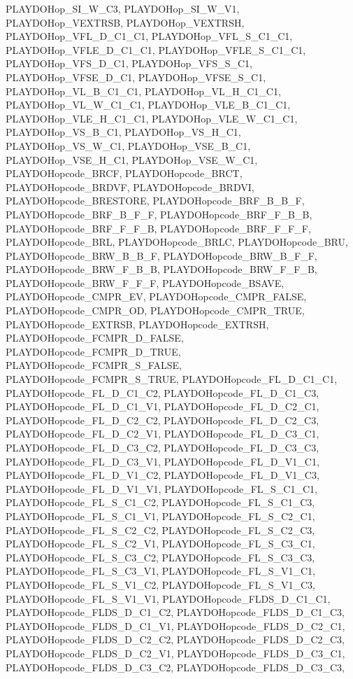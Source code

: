 PLAYDOHop\_\-SI\_\-W\_\-C3, PLAYDOHop\_\-SI\_\-W\_\-V1, PLAYDOHop\_\-VEXTRSB, PLAYDOHop\_\-VEXTRSH, PLAYDOHop\_\-VFL\_\-D\_\-C1\_\-C1, PLAYDOHop\_\-VFL\_\-S\_\-C1\_\-C1, PLAYDOHop\_\-VFLE\_\-D\_\-C1\_\-C1, PLAYDOHop\_\-VFLE\_\-S\_\-C1\_\-C1, PLAYDOHop\_\-VFS\_\-D\_\-C1, PLAYDOHop\_\-VFS\_\-S\_\-C1, PLAYDOHop\_\-VFSE\_\-D\_\-C1, PLAYDOHop\_\-VFSE\_\-S\_\-C1, PLAYDOHop\_\-VL\_\-B\_\-C1\_\-C1, PLAYDOHop\_\-VL\_\-H\_\-C1\_\-C1, PLAYDOHop\_\-VL\_\-W\_\-C1\_\-C1, PLAYDOHop\_\-VLE\_\-B\_\-C1\_\-C1, PLAYDOHop\_\-VLE\_\-H\_\-C1\_\-C1, PLAYDOHop\_\-VLE\_\-W\_\-C1\_\-C1, PLAYDOHop\_\-VS\_\-B\_\-C1, PLAYDOHop\_\-VS\_\-H\_\-C1, PLAYDOHop\_\-VS\_\-W\_\-C1, PLAYDOHop\_\-VSE\_\-B\_\-C1, PLAYDOHop\_\-VSE\_\-H\_\-C1, PLAYDOHop\_\-VSE\_\-W\_\-C1, PLAYDOHopcode\_\-BRCF, PLAYDOHopcode\_\-BRCT, PLAYDOHopcode\_\-BRDVF, PLAYDOHopcode\_\-BRDVI, PLAYDOHopcode\_\-BRESTORE, PLAYDOHopcode\_\-BRF\_\-B\_\-B\_\-F, PLAYDOHopcode\_\-BRF\_\-B\_\-F\_\-F, PLAYDOHopcode\_\-BRF\_\-F\_\-B\_\-B, PLAYDOHopcode\_\-BRF\_\-F\_\-F\_\-B, PLAYDOHopcode\_\-BRF\_\-F\_\-F\_\-F, PLAYDOHopcode\_\-BRL, PLAYDOHopcode\_\-BRLC, PLAYDOHopcode\_\-BRU, PLAYDOHopcode\_\-BRW\_\-B\_\-B\_\-F, PLAYDOHopcode\_\-BRW\_\-B\_\-F\_\-F, PLAYDOHopcode\_\-BRW\_\-F\_\-B\_\-B, PLAYDOHopcode\_\-BRW\_\-F\_\-F\_\-B, PLAYDOHopcode\_\-BRW\_\-F\_\-F\_\-F, PLAYDOHopcode\_\-BSAVE, PLAYDOHopcode\_\-CMPR\_\-EV, PLAYDOHopcode\_\-CMPR\_\-FALSE, PLAYDOHopcode\_\-CMPR\_\-OD, PLAYDOHopcode\_\-CMPR\_\-TRUE, PLAYDOHopcode\_\-EXTRSB, PLAYDOHopcode\_\-EXTRSH, PLAYDOHopcode\_\-FCMPR\_\-D\_\-FALSE, PLAYDOHopcode\_\-FCMPR\_\-D\_\-TRUE, PLAYDOHopcode\_\-FCMPR\_\-S\_\-FALSE, PLAYDOHopcode\_\-FCMPR\_\-S\_\-TRUE, PLAYDOHopcode\_\-FL\_\-D\_\-C1\_\-C1, PLAYDOHopcode\_\-FL\_\-D\_\-C1\_\-C2, PLAYDOHopcode\_\-FL\_\-D\_\-C1\_\-C3, PLAYDOHopcode\_\-FL\_\-D\_\-C1\_\-V1, PLAYDOHopcode\_\-FL\_\-D\_\-C2\_\-C1, PLAYDOHopcode\_\-FL\_\-D\_\-C2\_\-C2, PLAYDOHopcode\_\-FL\_\-D\_\-C2\_\-C3, PLAYDOHopcode\_\-FL\_\-D\_\-C2\_\-V1, PLAYDOHopcode\_\-FL\_\-D\_\-C3\_\-C1, PLAYDOHopcode\_\-FL\_\-D\_\-C3\_\-C2, PLAYDOHopcode\_\-FL\_\-D\_\-C3\_\-C3, PLAYDOHopcode\_\-FL\_\-D\_\-C3\_\-V1, PLAYDOHopcode\_\-FL\_\-D\_\-V1\_\-C1, PLAYDOHopcode\_\-FL\_\-D\_\-V1\_\-C2, PLAYDOHopcode\_\-FL\_\-D\_\-V1\_\-C3, PLAYDOHopcode\_\-FL\_\-D\_\-V1\_\-V1, PLAYDOHopcode\_\-FL\_\-S\_\-C1\_\-C1, PLAYDOHopcode\_\-FL\_\-S\_\-C1\_\-C2, PLAYDOHopcode\_\-FL\_\-S\_\-C1\_\-C3, PLAYDOHopcode\_\-FL\_\-S\_\-C1\_\-V1, PLAYDOHopcode\_\-FL\_\-S\_\-C2\_\-C1, PLAYDOHopcode\_\-FL\_\-S\_\-C2\_\-C2, PLAYDOHopcode\_\-FL\_\-S\_\-C2\_\-C3, PLAYDOHopcode\_\-FL\_\-S\_\-C2\_\-V1, PLAYDOHopcode\_\-FL\_\-S\_\-C3\_\-C1, PLAYDOHopcode\_\-FL\_\-S\_\-C3\_\-C2, PLAYDOHopcode\_\-FL\_\-S\_\-C3\_\-C3, PLAYDOHopcode\_\-FL\_\-S\_\-C3\_\-V1, PLAYDOHopcode\_\-FL\_\-S\_\-V1\_\-C1, PLAYDOHopcode\_\-FL\_\-S\_\-V1\_\-C2, PLAYDOHopcode\_\-FL\_\-S\_\-V1\_\-C3, PLAYDOHopcode\_\-FL\_\-S\_\-V1\_\-V1, PLAYDOHopcode\_\-FLDS\_\-D\_\-C1\_\-C1, PLAYDOHopcode\_\-FLDS\_\-D\_\-C1\_\-C2, PLAYDOHopcode\_\-FLDS\_\-D\_\-C1\_\-C3, PLAYDOHopcode\_\-FLDS\_\-D\_\-C1\_\-V1, PLAYDOHopcode\_\-FLDS\_\-D\_\-C2\_\-C1, PLAYDOHopcode\_\-FLDS\_\-D\_\-C2\_\-C2, PLAYDOHopcode\_\-FLDS\_\-D\_\-C2\_\-C3, PLAYDOHopcode\_\-FLDS\_\-D\_\-C2\_\-V1, PLAYDOHopcode\_\-FLDS\_\-D\_\-C3\_\-C1, PLAYDOHopcode\_\-FLDS\_\-D\_\-C3\_\-C2, PLAYDOHopcode\_\-FLDS\_\-D\_\-C3\_\-C3, 